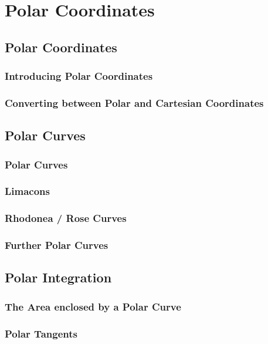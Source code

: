 \documentclass[../maths.tex]{subfiles}
\begin{document}
\chapter{Polar Coordinates}
\section{Polar Coordinates}
\subsection*{Introducing Polar Coordinates}
\subsection*{Converting between Polar and Cartesian Coordinates}
\section{Polar Curves}
\subsection*{Polar Curves}
\subsection*{Limacons}
\subsection*{Rhodonea / Rose Curves}
\subsection*{Further Polar Curves}
\section{Polar Integration}
\subsection*{The Area enclosed by a Polar Curve}
\subsection*{Polar Tangents}
\end{document}
